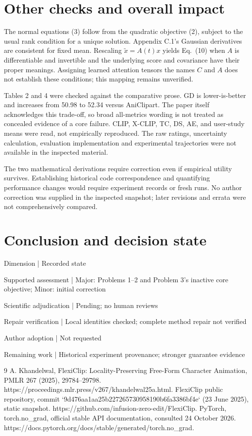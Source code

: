 \documentclass[10pt]{article}
\begin{document}
\section*{Other checks and overall impact}
The normal equations (3) follow from the quadratic objective (2), subject to the usual rank condition for a unique solution. Appendix C.1’s Gaussian derivatives are consistent for fixed mean. Rescaling \(\widetilde x=A(t)x\) yields Eq. (10) when \(A\) is differentiable and invertible and the underlying score and covariance have their proper meanings. Assigning learned attention tensors the names \(C\) and \(A\) does not establish these conditions; this mapping remains unverified.\par
Tables 2 and 4 were checked against the comparative prose. GD is lower-is-better and increases from 50.98 to 52.34 versus AniClipart. The paper itself acknowledges this trade-off, so broad all-metrics wording is not treated as concealed evidence of a core failure. CLIP, X-CLIP, TC, DS, AE, and user-study means were read, not empirically reproduced. The raw ratings, uncertainty calculation, evaluation implementation and experimental trajectories were not available in the inspected material.\par
The two mathematical derivations require correction even if empirical utility survives. Establishing historical code correspondence and quantifying performance changes would require experiment records or fresh runs. No author correction was supplied in the inspected snapshot; later revisions and errata were not comprehensively compared.\par
\section*{Conclusion and decision state}
Dimension | Recorded state\par
Supported assessment | Major: Problems 1–2 and Problem 3’s inactive core objective; Minor: initial correction\par
Scientific adjudication | Pending; no human reviews\par
Repair verification | Local identities checked; complete method repair not verified\par
Author adoption | Not requested\par
Remaining work | Historical experiment provenance; stronger guarantee evidence\par
9 A. Khandelwal, FlexiClip: Locality-Preserving Free-Form Character Animation, PMLR 267 (2025), 29784–29798. https://proceedings.mlr.press/v267/khandelwal25a.html. FlexiClip public repository, commit `9d476aa1aa25b227265730958190b6fa3386bf4e` (23 June 2025), static snapshot. https://github.com/infusion-zero-edit/FlexiClip. PyTorch, torch.no\_grad, official stable API documentation, consulted 24 October 2026. https://docs.pytorch.org/docs/stable/generated/torch.no\_grad.\par
\end{document}
